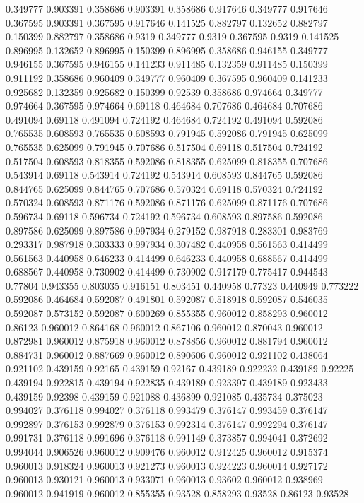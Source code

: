 0.349777 0.903391
0.358686 0.903391
0.358686 0.917646
0.349777 0.917646
0.367595 0.903391
0.367595 0.917646
0.141525 0.882797
0.132652 0.882797
0.150399 0.882797
0.358686 0.9319
0.349777 0.9319
0.367595 0.9319
0.141525 0.896995
0.132652 0.896995
0.150399 0.896995
0.358686 0.946155
0.349777 0.946155
0.367595 0.946155
0.141233 0.911485
0.132359 0.911485
0.150399 0.911192
0.358686 0.960409
0.349777 0.960409
0.367595 0.960409
0.141233 0.925682
0.132359 0.925682
0.150399 0.92539
0.358686 0.974664
0.349777 0.974664
0.367595 0.974664
0.69118 0.464684
0.707686 0.464684
0.707686 0.491094
0.69118 0.491094
0.724192 0.464684
0.724192 0.491094
0.592086 0.765535
0.608593 0.765535
0.608593 0.791945
0.592086 0.791945
0.625099 0.765535
0.625099 0.791945
0.707686 0.517504
0.69118 0.517504
0.724192 0.517504
0.608593 0.818355
0.592086 0.818355
0.625099 0.818355
0.707686 0.543914
0.69118 0.543914
0.724192 0.543914
0.608593 0.844765
0.592086 0.844765
0.625099 0.844765
0.707686 0.570324
0.69118 0.570324
0.724192 0.570324
0.608593 0.871176
0.592086 0.871176
0.625099 0.871176
0.707686 0.596734
0.69118 0.596734
0.724192 0.596734
0.608593 0.897586
0.592086 0.897586
0.625099 0.897586
0.997934 0.279152
0.987918 0.283301
0.983769 0.293317
0.987918 0.303333
0.997934 0.307482
0.440958 0.561563
0.414499 0.561563
0.440958 0.646233
0.414499 0.646233
0.440958 0.688567
0.414499 0.688567
0.440958 0.730902
0.414499 0.730902
0.917179 0.775417
0.944543 0.77804
0.943355 0.803035
0.916151 0.803451
0.440958 0.77323
0.440949 0.773222
0.592086 0.464684
0.592087 0.491801
0.592087 0.518918
0.592087 0.546035
0.592087 0.573152
0.592087 0.600269
0.855355 0.960012
0.858293 0.960012
0.86123 0.960012
0.864168 0.960012
0.867106 0.960012
0.870043 0.960012
0.872981 0.960012
0.875918 0.960012
0.878856 0.960012
0.881794 0.960012
0.884731 0.960012
0.887669 0.960012
0.890606 0.960012
0.921102 0.438064
0.921102 0.439159
0.92165 0.439159
0.92167 0.439189
0.922232 0.439189
0.92225 0.439194
0.922815 0.439194
0.922835 0.439189
0.923397 0.439189
0.923433 0.439159
0.92398 0.439159
0.921088 0.436899
0.921085 0.435734
0.375023 0.994027
0.376118 0.994027
0.376118 0.993479
0.376147 0.993459
0.376147 0.992897
0.376153 0.992879
0.376153 0.992314
0.376147 0.992294
0.376147 0.991731
0.376118 0.991696
0.376118 0.991149
0.373857 0.994041
0.372692 0.994044
0.906526 0.960012
0.909476 0.960012
0.912425 0.960012
0.915374 0.960013
0.918324 0.960013
0.921273 0.960013
0.924223 0.960014
0.927172 0.960013
0.930121 0.960013
0.933071 0.960013
0.93602 0.960012
0.938969 0.960012
0.941919 0.960012
0.855355 0.93528
0.858293 0.93528
0.86123 0.93528
